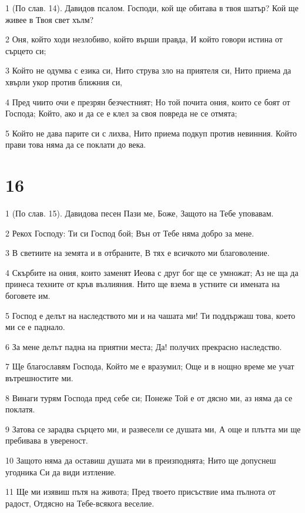\par 1 (По слав. 14). Давидов псалом. Господи, кой ще обитава в твоя шатър? Кой ще живее в Твоя свет хълм?
\par 2 Оня, който ходи незлобиво, който върши правда, И който говори истина от сърцето си;
\par 3 Който не одумва с езика си, Нито струва зло на приятеля си, Нито приема да хвърли укор против ближния си,
\par 4 Пред чиито очи е презрян безчестният; Но той почита ония, които се боят от Господа; Който, ако и да се е клел за своя повреда не се отмята;
\par 5 Който не дава парите си с лихва, Нито приема подкуп против невинния. Който прави това няма да се поклати до века.

\chapter{16}

\par 1 (По слав. 15). Давидова песен Пази ме, Боже, Защото на Тебе уповавам.
\par 2 Рекох Господу: Ти си Господ бой; Вън от Тебе няма добро за мене.
\par 3 В светиите на земята и в отбраните, В тях е всичкото ми благоволение.
\par 4 Скърбите на ония, които заменят Иеова с друг бог ще се умножат; Аз не ща да принеса техните от кръв възлияния. Нито ще взема в устните си имената на боговете им.
\par 5 Господ е делът на наследството ми и на чашата ми! Ти поддържаш това, което ми се е паднало.
\par 6 За мене делът падна на приятни места; Да! получих прекрасно наследство.
\par 7 Ще благославям Господа, Който ме е вразумил; Още и в нощно време ме учат вътрешностите ми.
\par 8 Винаги турям Господа пред себе си; Понеже Той е от дясно ми, аз няма да се поклатя.
\par 9 Затова се зарадва сърцето ми, и развесели се душата ми, А още и плътта ми ще пребивава в увереност.
\par 10 Защото няма да оставиш душата ми в преизподнята; Нито ще допуснеш угодника Си да види изтление.
\par 11 Ще ми изявиш пътя на живота; Пред твоето присъствие има пълнота от радост, Отдясно на Тебе-всякога веселие.

